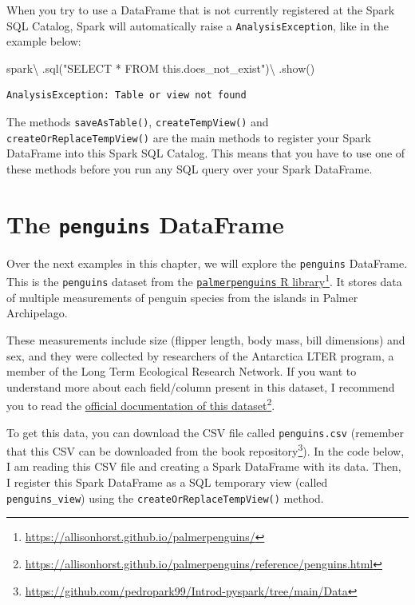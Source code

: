 \documentclass[
  11pt,
  letterpaper,
  DIV=11,
  numbers=noendperiod]{scrreprt}
\newenvironment{Shaded}{\begin{snugshade}}{\end{snugshade}}
\newcommand{\NormalTok}[1]{\textcolor[rgb]{0.00,0.23,0.31}{#1}}
\newcommand{\OperatorTok}[1]{\textcolor[rgb]{0.37,0.37,0.37}{#1}}
\newcommand{\StringTok}[1]{\textcolor[rgb]{0.13,0.47,0.30}{#1}}
\begin{document}
When you try to use a DataFrame that is not currently registered at the
Spark SQL Catalog, Spark will automatically raise a
\texttt{AnalysisException}, like in the example below:

\begin{Shaded}
\begin{Highlighting}[]
\NormalTok{spark}\OperatorTok{\textbackslash{}}
\NormalTok{  .sql(}\StringTok{"SELECT * FROM this.does\_not\_exist"}\NormalTok{)}\OperatorTok{\textbackslash{}}
\NormalTok{  .show()}
\end{Highlighting}
\end{Shaded}

\begin{verbatim}
AnalysisException: Table or view not found
\end{verbatim}

The methods \texttt{saveAsTable()}, \texttt{createTempView()} and
\texttt{createOrReplaceTempView()} are the main methods to register your
Spark DataFrame into this Spark SQL Catalog. This means that you have to
use one of these methods before you run any SQL query over your Spark
DataFrame.

\section{\texorpdfstring{The \texttt{penguins}
DataFrame}{The penguins DataFrame}}\label{the-penguins-dataframe}

Over the next examples in this chapter, we will explore the
\texttt{penguins} DataFrame. This is the \texttt{penguins} dataset from
the
\href{https://allisonhorst.github.io/palmerpenguins/}{\texttt{palmerpenguins}
R library}\footnote{\url{https://allisonhorst.github.io/palmerpenguins/}}.
It stores data of multiple measurements of penguin species from the
islands in Palmer Archipelago.

These measurements include size (flipper length, body mass, bill
dimensions) and sex, and they were collected by researchers of the
Antarctica LTER program, a member of the Long Term Ecological Research
Network. If you want to understand more about each field/column present
in this dataset, I recommend you to read the
\href{https://allisonhorst.github.io/palmerpenguins/reference/penguins.html}{official
documentation of this dataset}\footnote{\url{https://allisonhorst.github.io/palmerpenguins/reference/penguins.html}}.

To get this data, you can download the CSV file called
\texttt{penguins.csv} (remember that this CSV can be downloaded from the
book repository\footnote{\url{https://github.com/pedropark99/Introd-pyspark/tree/main/Data}}).
In the code below, I am reading this CSV file and creating a Spark
DataFrame with its data. Then, I register this Spark DataFrame as a SQL
temporary view (called \texttt{penguins\_view}) using the
\texttt{createOrReplaceTempView()} method.
\end{document}
